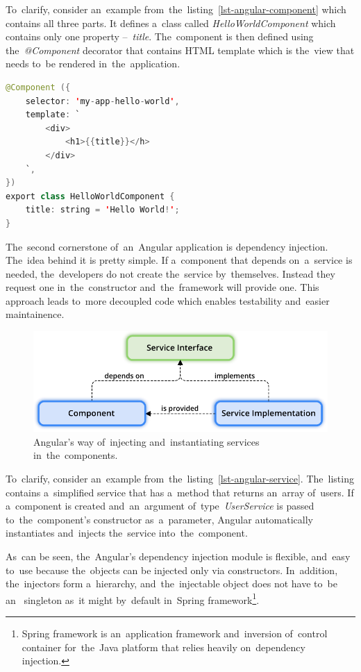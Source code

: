To~clarify, consider an~example from~the~listing~\ref{lst-angular-component}
which contains all three parts. It defines a~class called
\textit{HelloWorldComponent} which contains only one property --~\textit{title}.
The~component is then defined using the~\textit{@Component} decorator that
contains HTML template which is the~view that needs to~be rendered
in~the~application.

\pagebreak
\begin{lstlisting}[caption=An~Angular class with~the~\textit{@Component}
decorator and~a~HTML template., label=lst-angular-component, style=dp-default,
language=Java]
@Component ({
	selector: 'my-app-hello-world',
	template: `
		<div>
			<h1>{{title}}</h>
		</div>
	`,
})
export class HelloWorldComponent {
	title: string = 'Hello World!';
}
\end{lstlisting}

The~second cornerstone of~an~Angular application is dependency injection.
The~idea behind it is pretty simple. If a~component that depends on~a~service is
needed, the~developers do not create the~service by~themselves. Instead they
request one in~the~constructor and~the~framework will provide one. This approach
leads to~more decoupled code which enables testability and~easier maintainence.

\begin{figure}[!hbt]
	\centering
	\includegraphics[scale=0.8]{./figures/dependency-injection.pdf}
	\caption{Angular's way of~injecting and~instantiating services
	in~the~components.}
	\label{fig-dependency-injection}
\end{figure}

To~clarify, consider an~example from~the~listing~\ref{lst-angular-service}.
The~listing contains a~simplified service that has a~method that returns
an~array of~users. If a~component is created and~an~argument
of~type~\textit{UserService} is passed to~the~component's constructor
as~a~parameter, Angular automatically instantiates and~injects the~service
into~the~component. 

As~can be seen, the~Angular's dependency injection module is flexible, and~easy
to~use because the~objects can be injected only via constructors. In~addition,
the~injectors form a~hierarchy, and~the~injectable object does not have to~be
an~ singleton as~it might by~default in~Spring
framework\footnote{Spring framework is an~application framework and~inversion
of~control container for~the~Java platform that relies heavily on~dependency
injection.}.
\pagebreak

